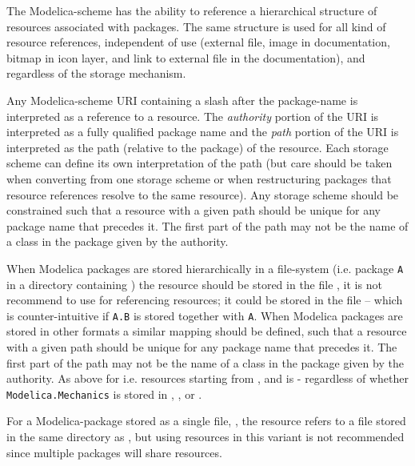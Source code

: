 The Modelica-scheme has the ability to reference a hierarchical
structure of resources associated with packages. The same structure is
used for all kind of resource references, independent of use (external
file, image in documentation, bitmap in icon layer, and link to external
file in the documentation), and regardless of the storage mechanism.

Any Modelica-scheme URI containing a slash after the package-name is
interpreted as a reference to a resource. The \emph{authority} portion of the
URI is interpreted as a fully qualified package name and the \emph{path}
portion of the URI is interpreted as the path (relative to the package)
of the resource. Each storage scheme can define its own interpretation
of the path (but care should be taken when converting from one storage
scheme or when restructuring packages that resource references resolve
to the same resource). Any storage scheme should be constrained such
that a resource with a given path should be unique for any package name
that precedes it. The first part of the path may not be the name of a
class in the package given by the authority.

When Modelica packages are stored hierarchically in a file-system (i.e.
package \lstinline!A! in a directory  containing ) the resource
 should be stored in the file
, it is not recommend to use 
for referencing resources; it could be stored in the file  --
which is counter-intuitive if \lstinline!A.B! is stored together with \lstinline!A!. When
Modelica packages are stored in other formats a similar mapping should
be defined, such that a resource with a given path should be unique for
any package name that precedes it. The first part of the path may not be
the name of a class in the package given by the authority. As above for
 i.e. resources starting from , and  is  - regardless of whether \lstinline!Modelica.Mechanics! is
stored in , , or .

For a Modelica-package stored as a single file, , the resource
 refers to a file  stored in the same
directory as , but using resources in this variant is not
recommended since multiple packages will share resources.

